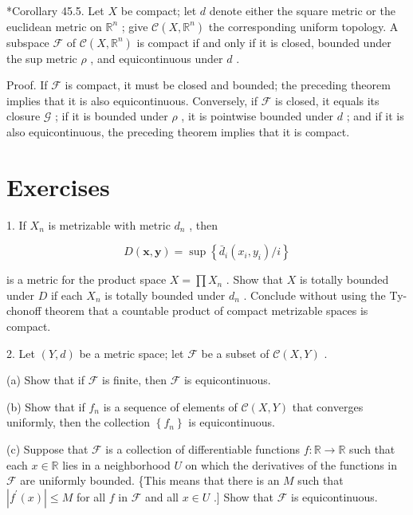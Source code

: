 \documentclass[10pt]{article}
\begin{document}
*Corollary 45.5. Let \(X\) be compact; let \(d\) denote either the square metric or the euclidean metric on \({\mathbb{R}}^{n}\) ; give \(\mathcal{C}\left( {X,{\mathbb{R}}^{n}}\right)\) the corresponding uniform topology. A subspace \(\mathcal{F}\) of \(\mathcal{C}\left( {X,{\mathbb{R}}^{n}}\right)\) is compact if and only if it is closed, bounded under the sup metric \(\rho\) , and equicontinuous under \(d\) .

Proof. If \(\mathcal{F}\) is compact, it must be closed and bounded; the preceding theorem implies that it is also equicontinuous. Conversely, if \(\mathcal{F}\) is closed, it equals its closure \(\mathcal{G}\) ; if it is bounded under \(\rho\) , it is pointwise bounded under \(d\) ; and if it is also equicontinuous, the preceding theorem implies that it is compact.

\section*{Exercises}

1. If \({X}_{n}\) is metrizable with metric \({d}_{n}\) , then

\[
D\left( {\mathbf{x},\mathbf{y}}\right)  = \sup \left\{  {{\bar{d}}_{i}\left( {{x}_{i},{y}_{i}}\right) /i}\right\}
\]

is a metric for the product space \(X = \prod {X}_{n}\) . Show that \(X\) is totally bounded under \(D\) if each \({X}_{n}\) is totally bounded under \({d}_{n}\) . Conclude without using the Ty-chonoff theorem that a countable product of compact metrizable spaces is compact.

2. Let \(\left( {Y,d}\right)\) be a metric space; let \(\mathcal{F}\) be a subset of \(\mathcal{C}\left( {X,Y}\right)\) .

(a) Show that if \(\mathcal{F}\) is finite, then \(\mathcal{F}\) is equicontinuous.

(b) Show that if \({f}_{n}\) is a sequence of elements of \(\mathcal{C}\left( {X,Y}\right)\) that converges uniformly, then the collection \(\left\{  {f}_{n}\right\}\) is equicontinuous.

(c) Suppose that \(\mathcal{F}\) is a collection of differentiable functions \(f : \mathbb{R} \rightarrow  \mathbb{R}\) such that each \(x \in  \mathbb{R}\) lies in a neighborhood \(U\) on which the derivatives of the functions in \(\mathcal{F}\) are uniformly bounded. \{This means that there is an \(M\) such that \(\left| {{f}^{\prime }\left( x\right) }\right|  \leq  M\) for all \(f\) in \(\mathcal{F}\) and all \(x \in  U\) .] Show that \(\mathcal{F}\) is equicontinuous.
\end{document}
